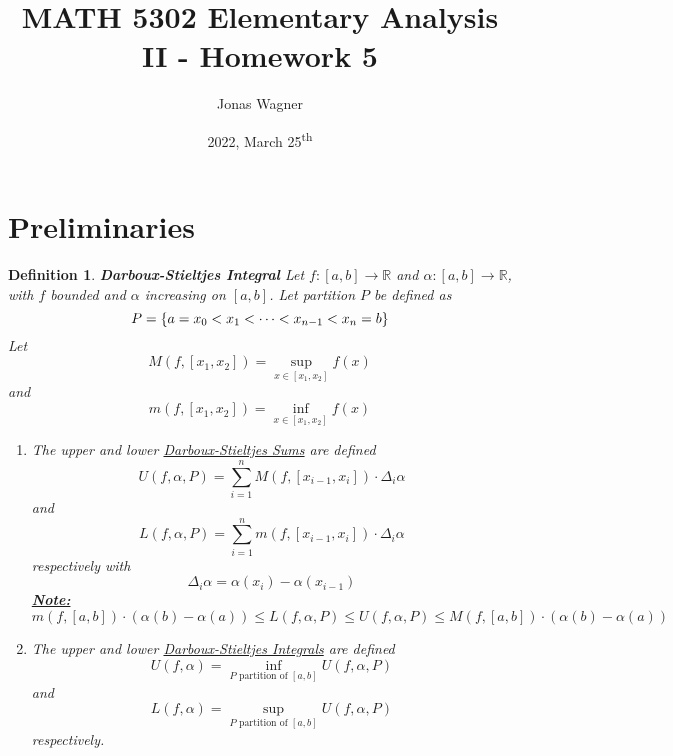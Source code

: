 \documentclass[]{article}
\title{MATH 5302 Elementary Analysis II - Homework 5}
\author{Jonas Wagner}
\date{2022, March 25\textsuperscript{th}}
\newcommand{\R}{\mathbb{R}}
\newtheorem{definition}{Definition}
\begin{document}
\maketitle


\section*{Preliminaries}
\begin{definition}
    \textbf{\emph{Darboux-Stieltjes Integral}}
    Let $f : [a,b] \to \R$ and $\alpha : [a,b] \to \R$, with $f$ bounded and $\alpha$ increasing on $[a,b]$.
    Let partition $P$ be defined as \[
        P = \qty{a = x_0 < x_1 < \cdots < x_{n-1} < x_n = b}
    \] Let \[
        M(f, [x_1, x_2]) = \sup_{x \in [x_1, x_2]} f(x)
    \] and \[
        m(f, [x_1, x_2]) = \inf_{x \in [x_1, x_2]} f(x)
    \]
    \begin{enumerate}
        \item The upper and lower \emph{\underline{Darboux-Stieltjes Sums}} are defined \[            
            U(f, \alpha, P) = \sum_{i=1}^{n} M(f, [x_{i-1}, x_i]) \cdot \Delta_i \alpha
        \] and \[
            L(f, \alpha, P) = \sum_{i=1}^{n} m(f, [x_{i-1}, x_i]) \cdot \Delta_i \alpha
        \] respectively with \[
            \Delta_i \alpha = \alpha(x_i) - \alpha(x_{i-1})
        \] 
        \emph{\textbf{\underline{Note:}}} \[
            m(f,[a,b]) \cdot (\alpha(b) - \alpha(a)) 
            \leq L(f, \alpha, P) 
            \leq U(f, \alpha, P)
            \leq M(f,[a,b]) \cdot (\alpha(b) - \alpha(a)) 
        \]
        \item The upper and lower \emph{\underline{Darboux-Stieltjes Integrals}} are defined \[            
            U(f, \alpha) = \inf_{P \text{ partition of } [a,b]} U(f, \alpha, P)
        \] and \[
            L(f, \alpha) = \sup_{P \text{ partition of } [a,b]} U(f, \alpha, P)
        \] respectively.


\end{enumerate}
\end{definition}
\end{document}
